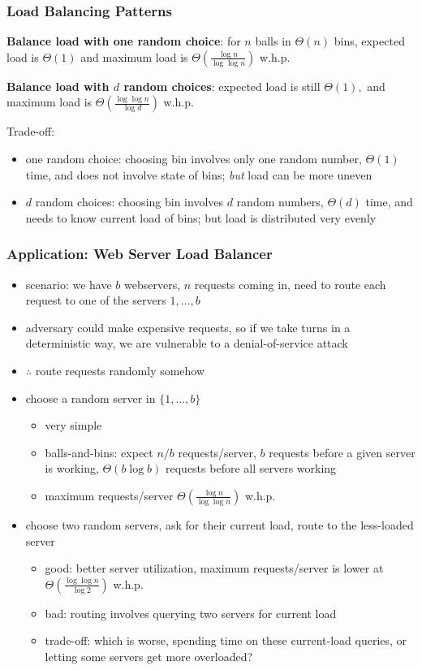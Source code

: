 \documentclass[10pt]{beamer}
\begin{document}
\begin{frame} \frametitle{Load Balancing Patterns}

\textbf{Balance load with one random choice}: for $n$ balls in $\Theta(n)$ bins,
expected load is $\Theta(1)$ and maximum load is $\Theta(\frac{\log n}{\log \log n})$ w.h.p.
\vspace{.5cm}

\textbf{Balance load with $d$ random choices}: expected load is still $\Theta(1),$
and maximum load is $\Theta(\frac{\log \log n}{\log d})$ w.h.p.
\vspace{.5cm}

Trade-off:
\begin{itemize}
  \item one random choice: choosing bin involves only one random number,
  $\Theta(1)$ time, and
    does not involve state of bins; \emph{but} load can be more uneven
  \item $d$ random choices: choosing bin involves $d$ random numbers,
  $\Theta(d)$ time, and needs to know current load of bins; but
  load is distributed very evenly
\end{itemize}
\end{frame}

\begin{frame} \frametitle{Application: Web Server Load Balancer}
\begin{itemize}
  \item scenario: we have $b$ webservers, $n$ requests coming in, need to route
    each request to one of the servers $1, \ldots, b$
  \item adversary could make expensive requests, so if we take turns in a deterministic
    way, we are vulnerable to a denial-of-service attack
  \item $\therefore$ route requests randomly somehow
  \item choose a random server in $\{1, \ldots, b\}$
  \begin{itemize}
    \item very simple
    \item balls-and-bins: expect $n/b$ requests/server, $b$ requests before
      a given server is working, $\Theta(b \log b)$ requests before all servers
      working
    \item maximum requests/server $\Theta(\frac{\log n}{\log \log n}) $ w.h.p.
  \end{itemize}
  \item choose two random servers, ask for their current load, route to
    the less-loaded server
    \begin{itemize}
      \item good: better server utilization, maximum requests/server is lower
        at $\Theta(\frac{\log \log n}{\log 2})$ w.h.p.
      \item bad: routing involves querying two servers for current load
      \item trade-off: which is worse, spending time on these current-load
        queries, or letting some servers get more overloaded?
    \end{itemize}
\end{itemize}
\end{frame}
\end{document}
